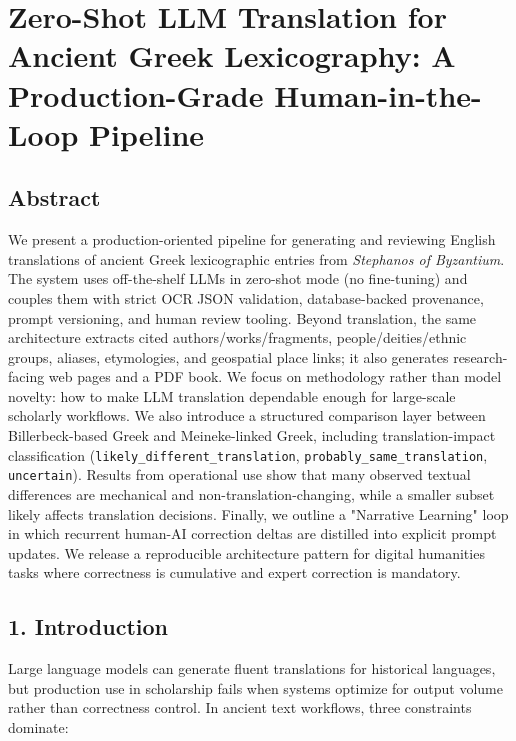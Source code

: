 \documentclass[
]{article}
\author{}
\date{}
\begin{document}
\hypertarget{zero-shot-llm-translation-for-ancient-greek-lexicography-a-production-grade-human-in-the-loop-pipeline}{%
\section{Zero-Shot LLM Translation for Ancient Greek Lexicography: A
Production-Grade Human-in-the-Loop
Pipeline}\label{zero-shot-llm-translation-for-ancient-greek-lexicography-a-production-grade-human-in-the-loop-pipeline}}

\hypertarget{abstract}{%
\subsection{Abstract}\label{abstract}}

We present a production-oriented pipeline for generating and reviewing
English translations of ancient Greek lexicographic entries from
\emph{Stephanos of Byzantium}. The system uses off-the-shelf LLMs in
zero-shot mode (no fine-tuning) and couples them with strict OCR JSON
validation, database-backed provenance, prompt versioning, and human
review tooling. Beyond translation, the same architecture extracts cited
authors/works/fragments, people/deities/ethnic groups, aliases,
etymologies, and geospatial place links; it also generates
research-facing web pages and a PDF book. We focus on methodology rather
than model novelty: how to make LLM translation dependable enough for
large-scale scholarly workflows. We also introduce a structured
comparison layer between Billerbeck-based Greek and Meineke-linked
Greek, including translation-impact classification
(\texttt{likely\_different\_translation},
\texttt{probably\_same\_translation}, \texttt{uncertain}). Results from
operational use show that many observed textual differences are
mechanical and non-translation-changing, while a smaller subset likely
affects translation decisions. Finally, we outline a "Narrative
Learning" loop in which recurrent human-AI correction deltas are
distilled into explicit prompt updates. We release a reproducible
architecture pattern for digital humanities tasks where correctness is
cumulative and expert correction is mandatory.

\hypertarget{1-introduction}{%
\subsection{1. Introduction}\label{1-introduction}}

Large language models can generate fluent translations for historical
languages, but production use in scholarship fails when systems optimize
for output volume rather than correctness control. In ancient text
workflows, three constraints dominate:
\end{document}
